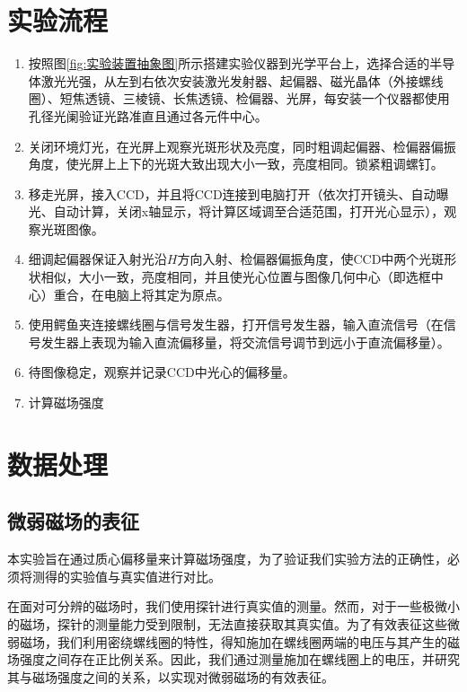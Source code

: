 \documentclass[12pt]{ctexart}
\numberwithin{equation}{section} %
\begin{document}
\section{实验流程}

\begin{enumerate}

\item 按照图\ref{fig:实验装置抽象图}所示搭建实验仪器到光学平台上，选择合适的半导体激光光强，从左到右依次安装激光发射器、起偏器、磁光晶体（外接螺线圈）、短焦透镜、三棱镜、长焦透镜、检偏器、光屏，每安装一个仪器都使用孔径光阑验证光路准直且通过各元件中心。
\item 关闭环境灯光，在光屏上观察光斑形状及亮度，同时粗调起偏器、检偏器偏振角度，使光屏上上下的光斑大致出现大小一致，亮度相同。锁紧粗调螺钉。
\item 移走光屏，接入CCD，并且将CCD连接到电脑打开（依次打开镜头、自动曝光、自动计算，关闭x轴显示，将计算区域调至合适范围，打开光心显示），观察光斑图像。
\item 细调起偏器保证入射光沿$H$方向入射、检偏器偏振角度，使CCD中两个光斑形状相似，大小一致，亮度相同，并且使光心位置与图像几何中心（即选框中心）重合，在电脑上将其定为原点。
\item 使用鳄鱼夹连接螺线圈与信号发生器，打开信号发生器，输入直流信号（在信号发生器上表现为输入直流偏移量，将交流信号调节到远小于直流偏移量）。
\item 待图像稳定，观察并记录CCD中光心的偏移量。
\item 计算磁场强度
\end{enumerate}



\section{数据处理}
\subsection{微弱磁场的表征}
本实验旨在通过质心偏移量来计算磁场强度，为了验证我们实验方法的正确性，必须将测得的实验值与真实值进行对比。

在面对可分辨的磁场时，我们使用探针进行真实值的测量。然而，对于一些极微小的磁场，探针的测量能力受到限制，无法直接获取其真实值。为了有效表征这些微弱磁场，我们利用密绕螺线圈的特性，得知施加在螺线圈两端的电压与其产生的磁场强度之间存在正比例关系。因此，我们通过测量施加在螺线圈上的电压，并研究其与磁场强度之间的关系，以实现对微弱磁场的有效表征。
\end{document}
